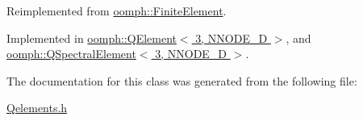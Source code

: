 Reimplemented from \hyperlink{classoomph_1_1FiniteElement_a863c4382c879a77ad5607c6f9781c761}{oomph\+::\+Finite\+Element}.



Implemented in \hyperlink{classoomph_1_1QElement_3_013_00_01NNODE__1D_01_4_a265f8f0f3d0067ff52648a7c3b50d9fe}{oomph\+::\+Q\+Element$<$ 3, N\+N\+O\+D\+E\+\_\+D $>$}, and \hyperlink{classoomph_1_1QSpectralElement_3_013_00_01NNODE__1D_01_4_a5de126080a4f72fe7b52012d7dacfc80}{oomph\+::\+Q\+Spectral\+Element$<$ 3, N\+N\+O\+D\+E\+\_\+D $>$}.



The documentation for this class was generated from the following file\+:\begin{DoxyCompactItemize}
\item 
\hyperlink{Qelements_8h}{Qelements.\+h}\end{DoxyCompactItemize}
